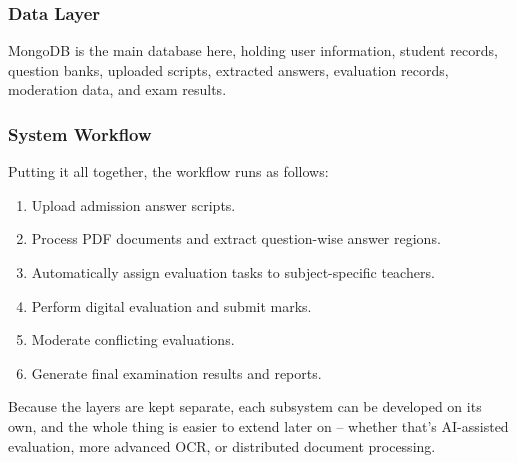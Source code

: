 \subsubsection{Data Layer}

MongoDB is the main database here, holding user information, student records, question banks, uploaded scripts, extracted answers, evaluation records, moderation data, and exam results.

\subsubsection{System Workflow}

Putting it all together, the workflow runs as follows:

\begin{enumerate}
    \item Upload admission answer scripts.
    \item Process PDF documents and extract question-wise answer regions.
    \item Automatically assign evaluation tasks to subject-specific teachers.
    \item Perform digital evaluation and submit marks.
    \item Moderate conflicting evaluations.
    \item Generate final examination results and reports.
\end{enumerate}

Because the layers are kept separate, each subsystem can be developed on its own, and the whole thing is easier to extend later on -- whether that's AI-assisted evaluation, more advanced OCR, or distributed document processing.

